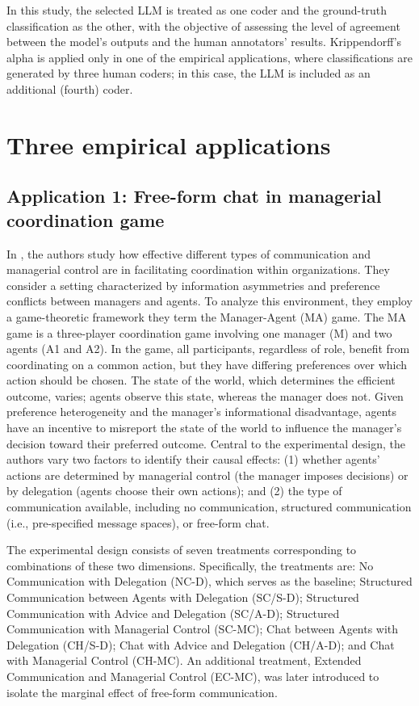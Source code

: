 \documentclass[11pt]{article}
\begin{document}
\begin{sloppypar}
In this study, the selected LLM is treated as one coder and the ground-truth classification as the other, with the objective of assessing the level of agreement between the model’s outputs and the human annotators’ results. Krippendorff’s alpha is applied only in one of the empirical applications, where classifications are generated by three human coders; in this case, the LLM is included as an additional (fourth) coder.



\section{Three empirical applications}\label{s-applications}
\subsection{Application 1: Free-form chat in managerial coordination game \citep{brandts_cooper_2025}}

In \citet{brandts_cooper_2025}, the authors study how effective different types of communication and managerial control are in facilitating coordination within organizations. They consider a setting characterized by information asymmetries and preference conflicts between managers and agents. To analyze this environment, they employ a game-theoretic framework they term the Manager-Agent (MA) game. The MA game is a three-player coordination game involving one manager (M) and two agents (A1 and A2). In the game, all participants, regardless of role, benefit from coordinating on a common action, but they have differing preferences over which action should be chosen. The state of the world, which determines the efficient outcome, varies; agents observe this state, whereas the manager does not. Given preference heterogeneity and the manager’s informational disadvantage, agents have an incentive to misreport the state of the world to influence the manager’s decision toward their preferred outcome. Central to the experimental design, the authors vary two factors to identify their causal effects: (1) whether agents’ actions are determined by managerial control (the manager imposes decisions) or by delegation (agents choose their own actions); and (2) the type of communication available, including no communication, structured communication (i.e., pre-specified message spaces), or free-form chat.

The experimental design consists of seven treatments corresponding to combinations of these two dimensions. Specifically, the treatments are: No Communication with Delegation (NC-D), which serves as the baseline; Structured Communication between Agents with Delegation (SC/S-D); Structured Communication with Advice and Delegation (SC/A-D); Structured Communication with Managerial Control (SC-MC); Chat between Agents with Delegation (CH/S-D); Chat with Advice and Delegation (CH/A-D); and Chat with Managerial Control (CH-MC). An additional treatment, Extended Communication and Managerial Control (EC-MC), was later introduced to isolate the marginal effect of free-form communication.


\end{sloppypar}
\end{document}
